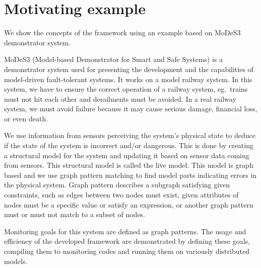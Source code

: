 \chapter{Motivating example}


We show the concepts of the framework using an example based on MoDeS3~\cite{modes3} demonstrator system. 

MoDeS3 (Model-based Demonstrator for Smart and Safe Systems) is a demonstrator system used for presenting the development and the capabilities of model-driven fault-tolerant systems.
It works on a model railway system. In this system, we have to ensure the correct operation of a railway system, eg.\ trains must not hit each other and derailments must be avoided. In a real railway system, we must avoid failure because it may cause serious damage, financial loss, or even death.

We use information from sensors perceiving the system's physical state to deduce if the state of the system is incorrect and/or dangerous. This is done by creating a structural model for the system and updating it based on sensor data coming from sensors. This structural model is called the live model. This model is graph based and we use graph pattern matching to find model parts indicating errors in the physical system. Graph pattern describes a subgraph satisfying given constraints, such as edges between two nodes must exist, given attributes of nodes must be a specific value or satisfy an expression, or another graph pattern must or must not match to a subset of nodes.

Monitoring goals for this system are defined as graph patterns. The usage and efficiency of the developed framework are demonstrated by defining these goals, compiling them to monitoring codes and running them on variously distributed models.

 



